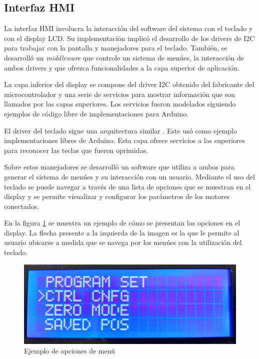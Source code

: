 \subsection{Interfaz HMI}

La interfaz HMI involucra la interacción del software del sistema con el teclado y con el display LCD. Su implementación implicó el desarrollo de los drivers de I2C para trabajar con la pantalla y manejadores para el teclado. También, se desarrolló un \textit{middleware} que controle un sistema de menúes, la interacción de ambos drivers y que ofrezca funcionalidades a la capa superior de aplicación.

La capa inferior del display se compone del driver I2C obtenido del fabricante del microcontrolador y una serie de servicios para mostrar información que son llamados por las capas superiores. Los servicios fueron modelados siguiendo ejemplos de código libre de implementaciones para Arduino\citep{web_repo_display_i2c}.

El driver del teclado sigue una arquitectura similar \citep{web_repo_keypad}. Este usó como ejemplo implementaciones libres de Arduino\citep{web_repo_keypad}. Esta capa ofrece servicios a las superiores para reconocer las teclas que fueron oprimidas.

Sobre estos manejadores se desarrolló un software que utiliza a ambos para generar el sistema de menúes y su interacción con un usuario. Mediante el uso del teclado se puede navegar a través de una lista de opciones que se muestran en el display y se permite visualizar y configurar los parámetros de los motores conectados. 

En la figura \ref{fig:menu} se muestra un ejemplo de cómo se presentan las opciones en el display. La flecha presente a la izquierda de la imagen es la que le permite al usuario ubicarse a medida que se navega por los menúes con la utilización del teclado.

\begin{figure}[htbp]
	\centering
	\includegraphics[scale=.08]{./Figures/display_menu.jpg}
	\caption{Ejemplo de opciones de menú}
	\label{fig:menu}
\end{figure}

